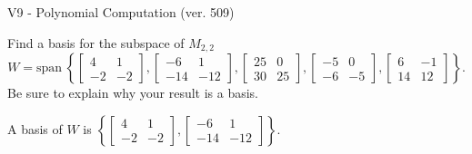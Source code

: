 \begin{exercise}
  \begin{exerciseTitle}V9 - Polynomial Computation (ver. 509)\end{exerciseTitle}
  \begin{exerciseStatement}
    Find a basis for the subspace of \(M_{2,2}\) 
\[W=\mathrm{span}\ \left\{\left[\begin{array}{cc}
4 & 1 \\
-2 & -2
\end{array}\right] , \left[\begin{array}{cc}
-6 & 1 \\
-14 & -12
\end{array}\right] , \left[\begin{array}{cc}
25 & 0 \\
30 & 25
\end{array}\right] , \left[\begin{array}{cc}
-5 & 0 \\
-6 & -5
\end{array}\right] , \left[\begin{array}{cc}
6 & -1 \\
14 & 12
\end{array}\right]\right\}.\]
 Be sure to explain why your result is a basis.


  \end{exerciseStatement}
  \begin{exerciseAnswer}
   A basis of \(W\) is  \(\left\{\left[\begin{array}{cc}
4 & 1 \\
-2 & -2
\end{array}\right] , \left[\begin{array}{cc}
-6 & 1 \\
-14 & -12
\end{array}\right]\right\}\).
  


  \end{exerciseAnswer}
\end{exercise}